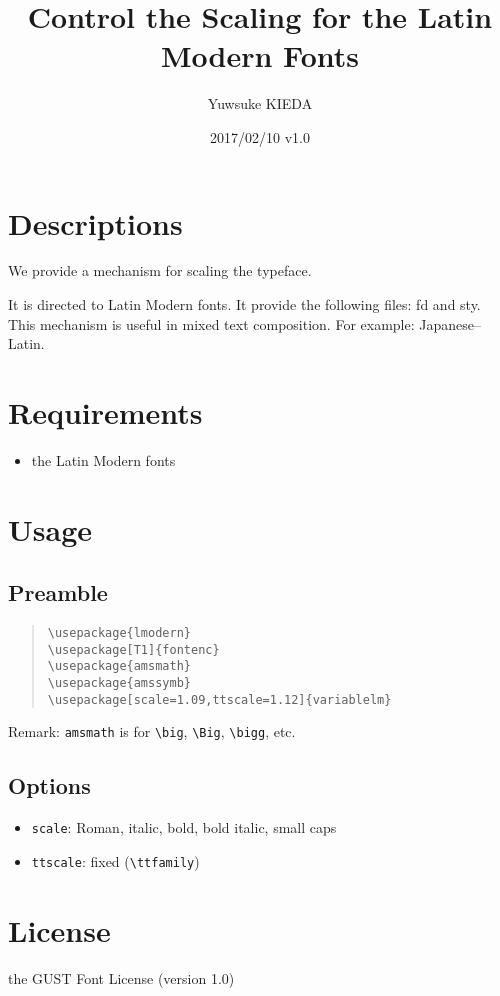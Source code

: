 \documentclass{article}
\title{Control the Scaling for the Latin Modern Fonts}
\author{Yuwsuke KIEDA}
\date{2017/02/10 v1.0}
\begin{document}
\maketitle

\section{Descriptions}

We provide a mechanism for scaling the typeface.

It is directed to Latin Modern fonts.
It provide the following files: fd and sty.
This mechanism is useful in mixed text composition.
For example: Japanese--Latin.

\section{Requirements}

\begin{itemize}
 \item the Latin Modern fonts
\end{itemize}

\section{Usage}

\subsection{Preamble}

\begin{quote}
\begin{verbatim}
\usepackage{lmodern}
\usepackage[T1]{fontenc}
\usepackage{amsmath}
\usepackage{amssymb}
\usepackage[scale=1.09,ttscale=1.12]{variablelm}
\end{verbatim}
\end{quote}

Remark: \texttt{amsmath} is for \verb!\big!, \verb!\Big!, \verb!\bigg!, etc.

\subsection{Options}

\begin{itemize}
 \item [\textendash] \texttt{scale}: Roman, italic, bold, bold italic, small caps
 \item [\textendash] \texttt{ttscale}: fixed (\verb!\ttfamily!)
\end{itemize}


\section{License}

the GUST Font License (version 1.0)
\end{document}
